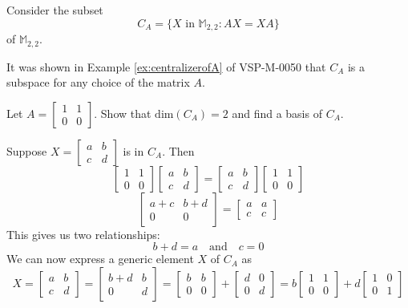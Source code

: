 \documentclass{ximera}
\begin{document}
\begin{example}\label{ex:CAbasis}
Consider the subset
\begin{equation*}
C_A = \{X \mbox{ in } \mathbb{M}_{2,2} : AX = XA \}
\end{equation*}
of $\mathbb{M}_{2,2}$. 

It was shown in Example \ref{ex:centralizerofA} of VSP-M-0050 that $C_A$ is a subspace for any choice of the matrix $A$.

Let $A = 
\begin{bmatrix}
1 & 1 \\
0 & 0
\end{bmatrix}$.
Show that $\mbox{dim}(C_A) = 2$ and find a basis of $C_A$.

\begin{explanation}
 Suppose $X = 
\begin{bmatrix}
a & b \\
c & d
\end{bmatrix}$
 is in $C_A$.  
 Then
 $$\begin{bmatrix}1&1\\0&0\end{bmatrix}\begin{bmatrix}a&b\\c&d\end{bmatrix}=\begin{bmatrix}a&b\\c&d\end{bmatrix}\begin{bmatrix}1&1\\0&0\end{bmatrix}$$
 $$\begin{bmatrix}a+c&b+d\\0&0\end{bmatrix}=\begin{bmatrix}a&a\\c&c\end{bmatrix}$$
 This gives us two relationships:  
 $$b+d=a\quad\text{and}\quad c=0$$
 We can now express a generic element $X$ of $C_A$ as
 $$X=\begin{bmatrix}a&b\\c&d\end{bmatrix}=\begin{bmatrix}b+d&b\\0&d\end{bmatrix}=\begin{bmatrix}b&b\\0&0\end{bmatrix}+\begin{bmatrix}d&0\\0&d\end{bmatrix}=b\begin{bmatrix}1&1\\0&0\end{bmatrix}+d\begin{bmatrix}1&0\\0&1\end{bmatrix}$$
 

\end{explanation}
\end{example}
\end{document}
